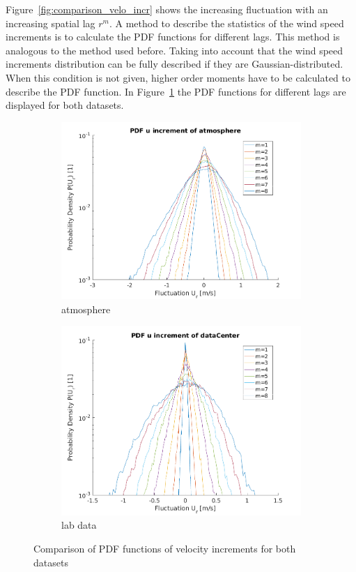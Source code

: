 \documentclass[12pt]{article}
\begin{document}
Figure~\ref{fig:comparison_velo_incr} shows the increasing fluctuation with an increasing spatial lag $r^m$. A method to describe the statistics of the wind speed increments is to calculate the PDF functions for different lags. This method is analogous to the method used before. Taking into account that the wind speed increments distribution can be fully described if they are Gaussian-distributed. When this condition is not given, higher order moments have to be calculated to describe the PDF function. In Figure~\ref{fig:comparison_pdf_incr} the PDF functions for different lags are displayed for both datasets. 
\begin{figure}[H]
\begin{subfigure}{0.5\textwidth}
  \centering
  \includegraphics[width=1\linewidth]{figures/pdf_increments_atmo.png}
  \caption{atmosphere}
\end{subfigure}
\begin{subfigure}{0.5\textwidth}
  \centering
  \includegraphics[width=1\linewidth]{figures/pdf_increments_center.png}
  \caption{lab data}
\end{subfigure}
\caption{Comparison of PDF functions of velocity increments for both datasets}
\label{fig:comparison_pdf_incr}
\end{figure}
\end{document}
